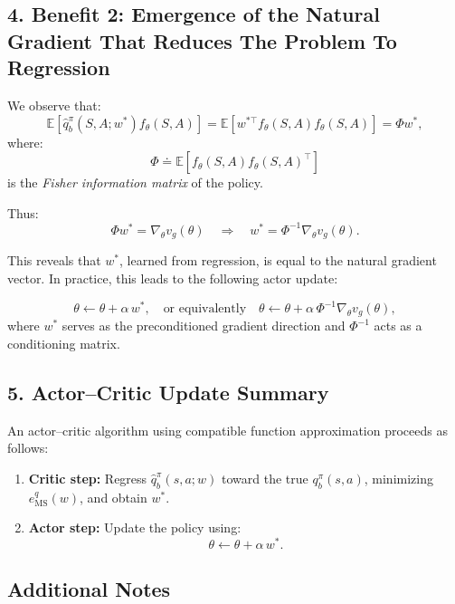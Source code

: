 \subsection*{4. Benefit 2: Emergence of the Natural Gradient That Reduces The Problem To Regression}

We observe that:
\[
\mathbb{E}\left[\hat{q}_b^\pi(S,A;w^*) f_\theta(S,A)\right]
= \mathbb{E}\left[w^{*\top} f_\theta(S,A) f_\theta(S,A)\right]
= \Phi w^*,
\]
where:
\[
\Phi \doteq \mathbb{E}\left[f_\theta(S,A) f_\theta(S,A)^\top\right]
\]
is the \emph{Fisher information matrix} of the policy.

Thus:
\[
\Phi w^* = \nabla_\theta v_g(\theta)
\quad \Rightarrow \quad
w^* = \Phi^{-1} \nabla_\theta v_g(\theta).
\]

This reveals that \(w^*\), learned from regression, is equal to the natural gradient vector. In practice, this leads to the following actor update:

\[
\theta \gets \theta + \alpha \, w^*,
\quad \text{or equivalently} \quad
\theta \gets \theta + \alpha \, \Phi^{-1} \nabla_\theta v_g(\theta),
\]
where \(w^*\) serves as the preconditioned gradient direction and \(\Phi^{-1}\) acts as a conditioning matrix.

\subsection*{5. Actor–Critic Update Summary}

An actor–critic algorithm using compatible function approximation proceeds as follows:
\begin{enumerate}
  \item \textbf{Critic step:} Regress \(\hat{q}_b^\pi(s,a;w)\) toward the true \(q_b^\pi(s,a)\), minimizing \(e_{\text{MS}}^q(w)\), and obtain \(w^*\).
  \item \textbf{Actor step:} Update the policy using:
  \[
  \theta \gets \theta + \alpha \, w^*.
  \]
\end{enumerate}

\subsection*{Additional Notes}

